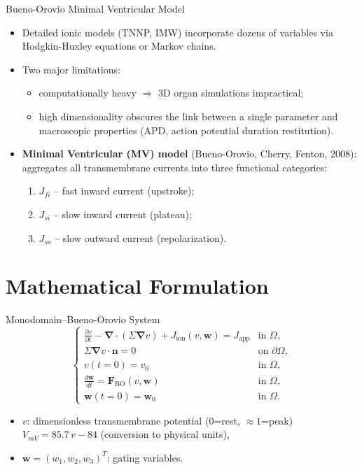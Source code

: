 \documentclass{beamer}
\begin{document}
\begin{frame}{Bueno-Orovio Minimal Ventricular Model}
\begin{itemize}
  \item Detailed ionic models (TNNP, IMW) incorporate dozens of variables via
        Hodgkin-Huxley equations or Markov chains.
  \item Two major limitations:
  \begin{itemize}
    \item computationally heavy $\Rightarrow$ 3D organ simulations impractical;
    \item high dimensionality obscures the link between a single parameter
          and macroscopic properties (APD,  action potential duration restitution).
  \end{itemize}
  \item \textbf{Minimal Ventricular (MV) model} (Bueno-Orovio, Cherry, Fenton, 2008):
        aggregates all transmembrane currents into three functional categories:
  \begin{enumerate}
    \item $J_{fi}$ -- fast inward current (upstroke);
    \item $J_{si}$ -- slow inward current (plateau);
    \item $J_{so}$ -- slow outward current (repolarization).
  \end{enumerate}
\end{itemize}
\end{frame}

\section{Mathematical Formulation}

\begin{frame}{Monodomain--Bueno-Orovio System}
\begin{equation*}
\left\{
\begin{array}{ll}
\displaystyle
\frac{\partial v}{\partial t}
-\boldsymbol{\nabla}\cdot(\Sigma\boldsymbol{\nabla} v)
+J_{\mathrm{ion}}(v,\mathbf{w})
=J_{\mathrm{app}}
& \text{in }\Omega, \\
\Sigma\boldsymbol{\nabla} v\cdot\mathbf{n} = 0
& \text{on }\partial\Omega, \\
v(t=0)=v_0
& \text{in }\Omega, \\
\displaystyle
\frac{d\mathbf{w}}{dt}=\mathbf{F}_{\mathrm{BO}}(v,\mathbf{w})
& \text{in }\Omega, \\
\mathbf{w}(t=0)=\mathbf{w}_0
& \text{in }\Omega.
\end{array}
\right.
\end{equation*}
\begin{itemize}
  \item $v$: dimensionless transmembrane potential ($0$=rest, $\approx 1$=peak)\\
  $V_{mV} = 85.7\,v - 84$ (conversion to physical units),
  \item $\mathbf{w} = (w_1,w_2,w_3)^T$: gating variables.
\end{itemize}
\end{frame}
\end{document}
